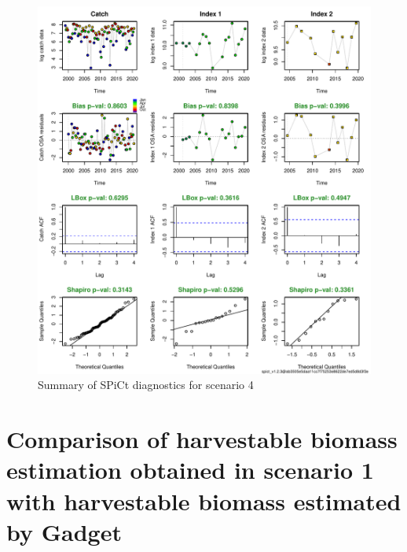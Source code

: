 \documentclass[review]{elsarticle}
\begin{document}
\begin{figure}[h!]
 \centering
 \includegraphics[]{./scenario4diag.pdf}
 \caption{Summary of SPiCt diagnostics for scenario 4}
 \label{diag4}
\end{figure}

\clearpage
\section{Comparison of harvestable biomass estimation obtained in scenario 1 with harvestable biomass estimated by Gadget}
\end{document}
